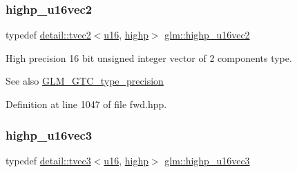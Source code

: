 \mbox{\label{group__gtc__type__precision_gafad4245d389a4990eb505cd74a2d0a6f}} 
\subsubsection{\texorpdfstring{highp\+\_\+u16vec2}{highp\_u16vec2}}
{\footnotesize\ttfamily typedef \hyperlink{structglm_1_1detail_1_1tvec2}{detail\+::tvec2}$<$\hyperlink{group__gtc__type__precision_gae7a1571503f83d2264ddfa705a6b082a}{u16}, \hyperlink{namespaceglm_a0f04f086094c747d227af4425893f545ac6f7eab42eacbb10d59a58e95e362074}{highp}$>$ \hyperlink{group__gtc__type__precision_gafad4245d389a4990eb505cd74a2d0a6f}{glm\+::highp\+\_\+u16vec2}}

High precision 16 bit unsigned integer vector of 2 components type. \begin{DoxySeeAlso}{See also}
\hyperlink{group__gtc__type__precision}{G\+L\+M\+\_\+\+G\+T\+C\+\_\+type\+\_\+precision} 
\end{DoxySeeAlso}


Definition at line 1047 of file fwd.\+hpp.

\mbox{\label{group__gtc__type__precision_gad98b30ad9bbfb79233340be3ba53ceb6}} 
\subsubsection{\texorpdfstring{highp\+\_\+u16vec3}{highp\_u16vec3}}
{\footnotesize\ttfamily typedef \hyperlink{structglm_1_1detail_1_1tvec3}{detail\+::tvec3}$<$\hyperlink{group__gtc__type__precision_gae7a1571503f83d2264ddfa705a6b082a}{u16}, \hyperlink{namespaceglm_a0f04f086094c747d227af4425893f545ac6f7eab42eacbb10d59a58e95e362074}{highp}$>$ \hyperlink{group__gtc__type__precision_gad98b30ad9bbfb79233340be3ba53ceb6}{glm\+::highp\+\_\+u16vec3}}

